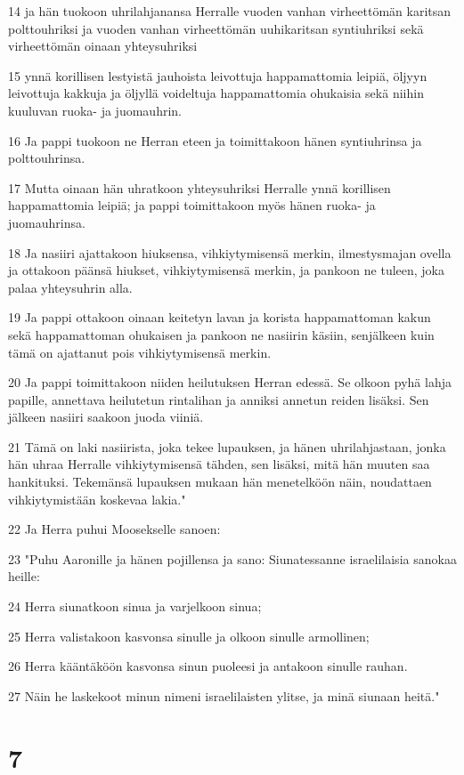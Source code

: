 \par 14 ja hän tuokoon uhrilahjanansa Herralle vuoden vanhan virheettömän karitsan polttouhriksi ja vuoden vanhan virheettömän uuhikaritsan syntiuhriksi sekä virheettömän oinaan yhteysuhriksi
\par 15 ynnä korillisen lestyistä jauhoista leivottuja happamattomia leipiä, öljyyn leivottuja kakkuja ja öljyllä voideltuja happamattomia ohukaisia sekä niihin kuuluvan ruoka- ja juomauhrin.
\par 16 Ja pappi tuokoon ne Herran eteen ja toimittakoon hänen syntiuhrinsa ja polttouhrinsa.
\par 17 Mutta oinaan hän uhratkoon yhteysuhriksi Herralle ynnä korillisen happamattomia leipiä; ja pappi toimittakoon myös hänen ruoka- ja juomauhrinsa.
\par 18 Ja nasiiri ajattakoon hiuksensa, vihkiytymisensä merkin, ilmestysmajan ovella ja ottakoon päänsä hiukset, vihkiytymisensä merkin, ja pankoon ne tuleen, joka palaa yhteysuhrin alla.
\par 19 Ja pappi ottakoon oinaan keitetyn lavan ja korista happamattoman kakun sekä happamattoman ohukaisen ja pankoon ne nasiirin käsiin, senjälkeen kuin tämä on ajattanut pois vihkiytymisensä merkin.
\par 20 Ja pappi toimittakoon niiden heilutuksen Herran edessä. Se olkoon pyhä lahja papille, annettava heilutetun rintalihan ja anniksi annetun reiden lisäksi. Sen jälkeen nasiiri saakoon juoda viiniä.
\par 21 Tämä on laki nasiirista, joka tekee lupauksen, ja hänen uhrilahjastaan, jonka hän uhraa Herralle vihkiytymisensä tähden, sen lisäksi, mitä hän muuten saa hankituksi. Tekemänsä lupauksen mukaan hän menetelköön näin, noudattaen vihkiytymistään koskevaa lakia."
\par 22 Ja Herra puhui Moosekselle sanoen:
\par 23 "Puhu Aaronille ja hänen pojillensa ja sano: Siunatessanne israelilaisia sanokaa heille:
\par 24 Herra siunatkoon sinua ja varjelkoon sinua;
\par 25 Herra valistakoon kasvonsa sinulle ja olkoon sinulle armollinen;
\par 26 Herra kääntäköön kasvonsa sinun puoleesi ja antakoon sinulle rauhan.
\par 27 Näin he laskekoot minun nimeni israelilaisten ylitse, ja minä siunaan heitä."

\chapter{7}

